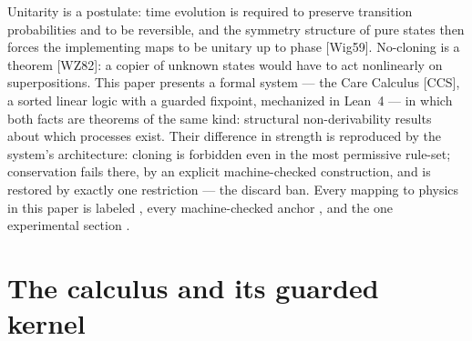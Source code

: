 \documentclass[11pt]{article}
\begin{document}
Unitarity is a postulate: time evolution is required to preserve transition
probabilities and to be reversible, and the symmetry structure of pure states
then forces the implementing maps to be unitary up to phase [Wig59].
No-cloning is a theorem [WZ82]: a copier of unknown states would have to act
nonlinearly on superpositions. This paper presents a formal system --- the
Care Calculus [CCS], a sorted linear logic with a guarded fixpoint, mechanized
in Lean~4 --- in which both facts are theorems of the same kind: structural
non-derivability results about which processes exist. Their difference in
strength is reproduced by the system's architecture: cloning is forbidden even
in the most permissive rule-set; conservation fails there, by an explicit
machine-checked construction, and is restored by exactly one restriction ---
the discard ban. Every mapping to physics in this paper is labeled
, every machine-checked anchor , and the
one experimental section .

\section{The calculus and its guarded kernel}
\end{document}
